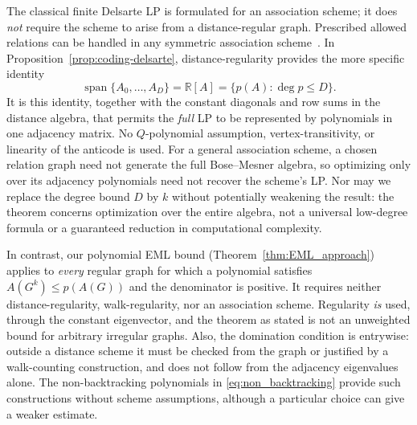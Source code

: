 \documentclass[11pt]{article}
\theoremstyle{plain}
\numberwithin{equation}{section}
\begin{document}
The classical finite Delsarte LP is formulated for an association scheme; it does \emph{not} require the scheme to arise from a distance-regular graph. Prescribed allowed relations can be handled in any symmetric association scheme~\cite{Delsarte_1973,Schrijver_1979}. In Proposition~\ref{prop:coding-delsarte}, distance-regularity provides the more specific identity
\[
 \operatorname{span}\{A_0,\ldots,A_D\}=\mathbb R[A]
   =\{p(A):\deg p\le D\}.
\]
It is this identity, together with the constant diagonals and row sums in the distance algebra, that permits the \emph{full} LP to be represented by polynomials in one adjacency matrix. No $Q$-polynomial assumption, vertex-transitivity, or linearity of the anticode is used. For a general association scheme, a chosen relation graph need not generate the full Bose--Mesner algebra, so optimizing only over its adjacency polynomials need not recover the scheme's LP. Nor may we replace the degree bound $D$ by $k$ without potentially weakening the result: the theorem concerns optimization over the entire algebra, not a universal low-degree formula or a guaranteed reduction in computational complexity.

In contrast, our polynomial EML bound (Theorem~\ref{thm:EML_approach}) applies to \emph{every} regular graph for which a polynomial satisfies $A(G^k)\le p(A(G))$ and the denominator is positive. It requires neither distance-regularity, walk-regularity, nor an association scheme. Regularity \emph{is} used, through the constant eigenvector, and the theorem as stated is not an unweighted bound for arbitrary irregular graphs. Also, the domination condition is entrywise: outside a distance scheme it must be checked from the graph or justified by a walk-counting construction, and does not follow from the adjacency eigenvalues alone. The non-backtracking polynomials in \eqref{eq:non_backtracking} provide such constructions without scheme assumptions, although a particular choice can give a weaker estimate.

\end{document}
